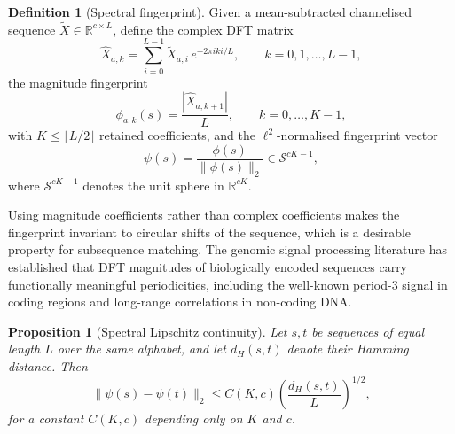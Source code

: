\documentclass[twocolumn,11pt,a4paper]{article}
\newtheorem{proposition}[theorem]{Proposition}
\theoremstyle{definition}
\newtheorem{definition}[theorem]{Definition}
\theoremstyle{remark}
\newcommand{\R}{\mathbb{R}}
\begin{document}
\begin{definition}[Spectral fingerprint]
\label{def:fingerprint}
Given a mean-subtracted channelised sequence $\widetilde{X} \in \R^{c \times L}$,
define the complex DFT matrix
\begin{equation}
  \widehat{X}_{a,k} = \sum_{i=0}^{L-1} \widetilde{X}_{a,i}\, e^{-2\pi i ki/L},
  \qquad k = 0, 1, \ldots, L-1,
  \label{eq:dft}
\end{equation}
the magnitude fingerprint
\begin{equation}
  \phi_{a,k}(s) = \frac{|\widehat{X}_{a,k+1}|}{L}, \qquad k = 0, \ldots, K-1,
  \label{eq:magnitude}
\end{equation}
with $K \leq \lfloor L/2 \rfloor$ retained coefficients, and the
$\ell^2$-normalised fingerprint vector
\begin{equation}
  \psi(s) = \frac{\phi(s)}{\|\phi(s)\|_2} \in \mathcal{S}^{cK-1},
  \label{eq:normalised_fingerprint}
\end{equation}
where $\mathcal{S}^{cK-1}$ denotes the unit sphere in $\R^{cK}$.
\end{definition}

Using magnitude coefficients rather than complex coefficients makes the
fingerprint invariant to circular shifts of the sequence, which is a desirable
property for subsequence matching. The genomic signal processing literature
\citep{anastassiou2001, voss1992} has established that DFT magnitudes of
biologically encoded sequences carry functionally meaningful periodicities,
including the well-known period-3 signal in coding regions and long-range
correlations in non-coding DNA.

\begin{proposition}[Spectral Lipschitz continuity]
\label{prop:lipschitz}
Let $s, t$ be sequences of equal length $L$ over the same alphabet, and let
$d_H(s, t)$ denote their Hamming distance. Then
\begin{equation}
  \|\psi(s) - \psi(t)\|_2 \leq C(K, c)\left(\frac{d_H(s,t)}{L}\right)^{1/2},
  \label{eq:lipschitz}
\end{equation}
for a constant $C(K, c)$ depending only on $K$ and $c$.
\end{proposition}
\end{document}
